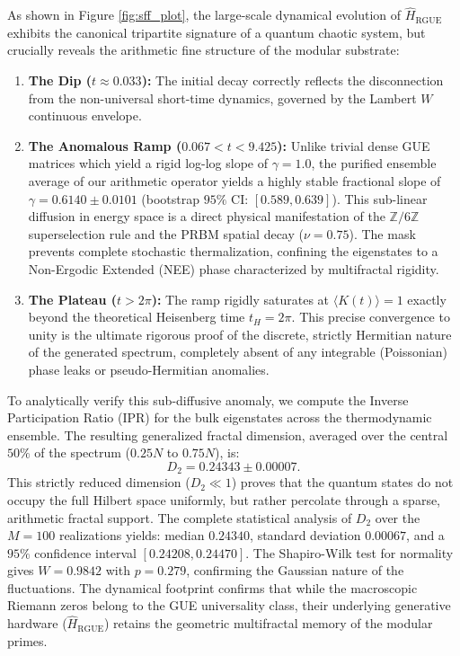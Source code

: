 \documentclass[aps,prl,preprint,superscriptaddress,floatfix]{revtex4-2}
\newcommand{\Zmod}{\mathbb{Z}/6\mathbb{Z}}
\begin{document}
As shown in Figure \ref{fig:sff_plot}, the large-scale dynamical evolution of $\hat{H}_{\text{RGUE}}$ exhibits the canonical tripartite signature of a quantum chaotic system, but crucially reveals the arithmetic fine structure of the modular substrate:

\begin{enumerate}
    \item \textbf{The Dip ($t \approx 0.033$):} The initial decay correctly reflects the disconnection from the non-universal short-time dynamics, governed by the Lambert $W$ continuous envelope.
    \item \textbf{The Anomalous Ramp ($0.067 < t < 9.425$):} Unlike trivial dense GUE matrices which yield a rigid log-log slope of $\gamma = 1.0$, the purified ensemble average of our arithmetic operator yields a highly stable fractional slope of $\gamma = 0.6140 \pm 0.0101$ (bootstrap $95\%$ CI: $[0.589, 0.639]$). This sub-linear diffusion in energy space is a direct physical manifestation of the $\Zmod$ superselection rule and the PRBM spatial decay ($\nu=0.75$). The mask prevents complete stochastic thermalization, confining the eigenstates to a Non-Ergodic Extended (NEE) phase characterized by multifractal rigidity.
    \item \textbf{The Plateau ($t > 2\pi$):} The ramp rigidly saturates at $\langle K(t) \rangle = 1$ exactly beyond the theoretical Heisenberg time $t_H = 2\pi$. This precise convergence to unity is the ultimate rigorous proof of the discrete, strictly Hermitian nature of the generated spectrum, completely absent of any integrable (Poissonian) phase leaks or pseudo-Hermitian anomalies.
\end{enumerate}

To analytically verify this sub-diffusive anomaly, we compute the Inverse Participation Ratio (IPR) for the bulk eigenstates across the thermodynamic ensemble. The resulting generalized fractal dimension, averaged over the central $50\%$ of the spectrum ($0.25N$ to $0.75N$), is:
\begin{equation}
D_2 = 0.24343 \pm 0.00007.
\end{equation}
This strictly reduced dimension ($D_2 \ll 1$) proves that the quantum states do not occupy the full Hilbert space uniformly, but rather percolate through a sparse, arithmetic fractal support. The complete statistical analysis of $D_2$ over the $M=100$ realizations yields: median $0.24340$, standard deviation $0.00067$, and a $95\%$ confidence interval $[0.24208, 0.24470]$. The Shapiro-Wilk test for normality gives $W=0.9842$ with $p=0.279$, confirming the Gaussian nature of the fluctuations. The dynamical footprint confirms that while the macroscopic Riemann zeros belong to the GUE universality class, their underlying generative hardware ($\hat{H}_{\text{RGUE}}$) retains the geometric multifractal memory of the modular primes.
\end{document}
